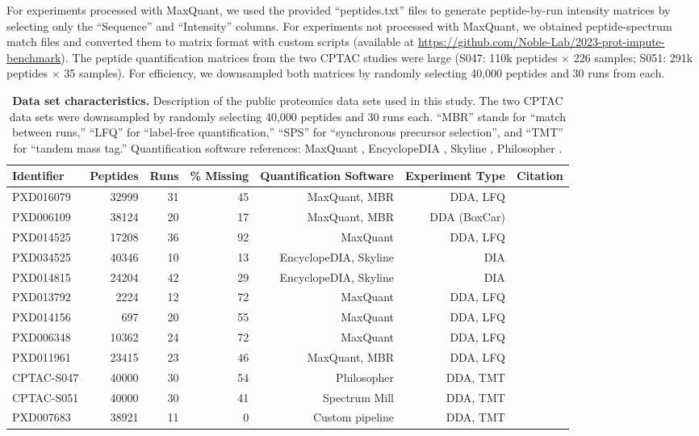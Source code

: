 \documentclass{article}
\begin{document}
For experiments processed with MaxQuant, we used the provided ``peptides.txt'' files to generate peptide-by-run intensity matrices by selecting only the ``Sequence'' and ``Intensity'' columns. For experiments not processed with MaxQuant, we obtained peptide-spectrum match files and converted them to matrix format with custom scripts (available at \url{https://github.com/Noble-Lab/2023-prot-impute-benchmark}). The peptide quantification matrices from the two CPTAC studies were large (S047: 110k peptides $\times$ 226 samples; S051: 291k peptides $\times$ 35 samples). For efficiency, we downsampled both matrices by randomly selecting 40,000 peptides and 30 runs from each.

\begin{table}
  \centering
  \normalsize
  \begin{tabular}{lrrrrrr}
    \hline
    Identifier & Peptides & Runs & \% Missing & Quantification Software & Experiment Type & Citation \\
    \hline
    PXD016079 & 32999 & 31 & 45 & MaxQuant, MBR & DDA, LFQ & \cite{pxd016079} \\
    PXD006109 & 38124 & 20 & 17 & MaxQuant, MBR & DDA (BoxCar) & \cite{pxd006109} \\
    PXD014525 & 17208 & 36 & 92 & MaxQuant & DDA, LFQ & \cite{pxd014525} \\
    PXD034525 & 40346 & 10 & 13 & EncyclopeDIA, Skyline & DIA & \cite{smtg-maccoss} \\
    PXD014815 & 24204 & 42 & 29 & EncyclopeDIA, Skyline & DIA & \cite{matrix-matched-calib} \\
    PXD013792 & 2224 & 12 & 72 & MaxQuant & DDA, LFQ & \cite{pxd013792} \\
    PXD014156 & 697 & 20 & 55 & MaxQuant & DDA, LFQ & \cite{pxd014156} \\
    PXD006348 & 10362 & 24 & 72 & MaxQuant & DDA, LFQ & \cite{pxd006348} \\
    PXD011961 & 23415 & 23 & 46 & MaxQuant, MBR & DDA, LFQ & \cite{pxd011961} \\
    CPTAC-S047 & 40000 & 30 & 54 & Philosopher & DDA, TMT & \cite{CPTAC-S047} \\
    CPTAC-S051 & 40000 & 30 & 41 & Spectrum Mill & DDA, TMT & \cite{CPTAC-S051} \\
    PXD007683 & 38921 & 11 & 0 & Custom pipeline & DDA, TMT & \cite{pxd007683} \\
    \hline
  \end{tabular}
  \caption{{\bf Data set characteristics.} Description of the public proteomics data sets used in this study. The two CPTAC data sets were downsampled by randomly selecting 40,000 peptides and 30 runs each. ``MBR'' stands for ``match between runs,'' ``LFQ'' for ``label-free quantification,'' ``SPS'' for ``synchronous precursor selection'', and ``TMT'' for ``tandem mass tag.'' Quantification software references: MaxQuant \cite{MaxQuant}, EncyclopeDIA \cite{chromatogram-DIA}, Skyline \cite{skyline}, Philosopher \cite{philosopher}.
    \label{tab:data-description}}
\end{table}
\end{document}
